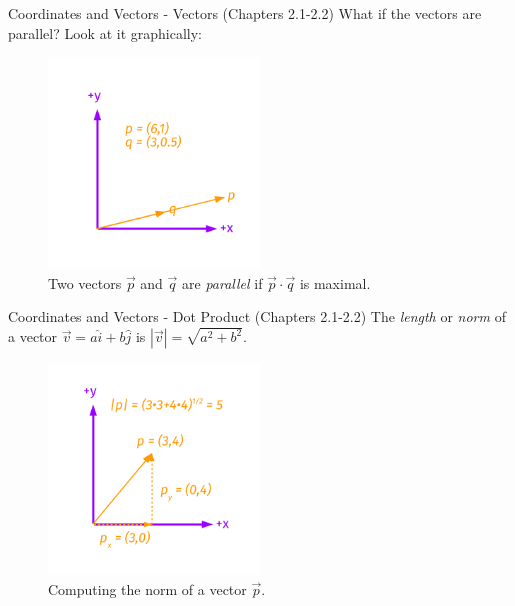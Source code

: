 \documentclass{beamer}
\begin{document}
\begin{frame}{Coordinates and Vectors - Vectors (Chapters 2.1-2.2)}
What if the vectors are parallel? Look at it graphically:
\begin{figure}
\centering
\includegraphics[width=0.5\textwidth,trim=1cm 1cm 1cm 1cm,clip=true]{figures/Vectors6.pdf}
\caption{\label{fig:twovectors5} Two vectors $\vec{p}$ and $\vec{q}$ are \textit{parallel} if $\vec{p} \cdot \vec{q}$ is maximal.}
\end{figure}
\end{frame}

\begin{frame}{Coordinates and Vectors - Dot Product (Chapters 2.1-2.2)}
The \textit{length} or \textit{norm} of a vector $\vec{v} = a\hat{i}+b\hat{j}$ is $|\vec{v}| = \sqrt{a^2+b^2}$.\\
\begin{figure}
\centering
\includegraphics[width=0.5\textwidth,trim=1cm 1cm 1cm 1cm,clip=true]{figures/Vectors7.pdf}
\caption{\label{fig:twovectors6} Computing the norm of a vector $\vec{p}$.}
\end{figure}
\end{frame}
\end{document}
